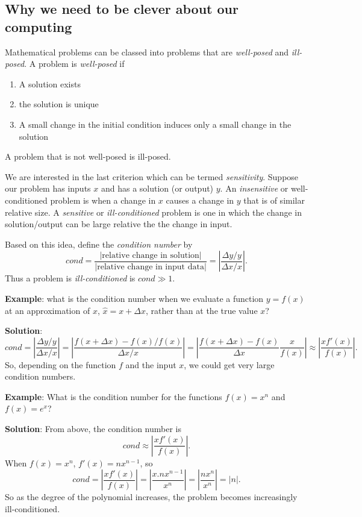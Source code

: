 \subsection{Why we need to be clever about our computing}

Mathematical problems can be classed into problems that are {\em well-posed} and {\em ill-posed}.  A problem is {\em well-posed} if 
\begin{enumerate}
\item A solution exists
\item the solution is unique
\item A small change in the initial condition induces only a small change in the solution
\end{enumerate}
A problem that is not well-posed is ill-posed.

We are interested in the last criterion which can be termed {\em sensitivity}.  Suppose our problem has inputs $x$ and has a solution (or output) $y$.  An {\em insensitive} or {well-conditioned} problem is when a change in $x$ causes a change in $y$ that is of similar relative size.  A {\em sensitive} or {\em ill-conditioned} problem is one in which the change in solution/output can be  large relative the the change in input.  

Based on this idea, define the {\em condition number} by 
\[ cond = \frac{|\mbox{relative change in solution}|}{|\mbox{relative change in input data}|} = \left|\frac{\Delta y/y}{\Delta x/x}\right |. \]
Thus a problem is {\em ill-conditioned} is $cond \gg 1.$

{\bf Example}:  what is the condition number when we evaluate a function $y = f(x)$ at an approximation of $x$, $\hat x = x+ \Delta x$, rather than at the true value $x$?

{\bf Solution}: \[ cond = \left|\frac{\Delta y/y}{\Delta x/x}\right | = \left|\frac{f(x+\Delta x) - f(x)/f(x)}{\Delta x/x}\right | = \left|\frac{f(x+\Delta x) - f(x)}{\Delta x} \frac {x}{f(x)}\right | \approx \left | \frac{x f'(x)}{f(x)} \right |.  \]
So, depending on the function $f$ and the input $x$, we could get very large condition numbers. \sqend

{\bf Example}:  What is the condition number for the functions $f(x) = x^n$ and $f(x) = e^x$?

{\bf Solution}: From above, the condition number is \[ cond \approx \left | \frac{x f'(x)}{f(x)} \right |. \]  When $f(x) = x^n$, $f'(x) = n x^{n-1}$, so  \[ cond =  \left | \frac{x f'(x)}{f(x)} \right | = \left | \frac{x . n x^{n-1}}{x^n} \right | = \left | \frac{ n x^{n}}{x^n} \right |  = |n|.\]
So as the degree of the polynomial increases, the problem becomes increasingly ill-conditioned.



